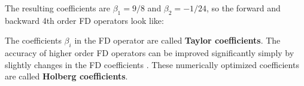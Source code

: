 \documentclass{hitec}
\begin{document}
The resulting coefficients are $\beta_1=9/8$ and $\beta_2=-1/24$, so the forward and backward 4th order FD operators look like:


The coefficients $\beta_i$ in the FD operator are called {\bf{Taylor coefficients}}. The accuracy of higher order FD operators can be improved significantly simply by slightly changes in the FD coefficients \cite{holberg:87}. These numerically optimized coefficients are called {\bf{Holberg coefficients}}.
\end{document}
